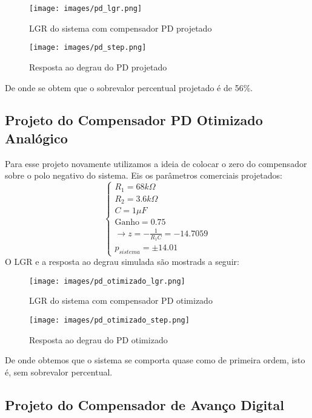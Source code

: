 \begin{figure}[H]
\centering
\texttt{[image: images/pd\_lgr.png]}
\caption{LGR do sistema com compensador PD projetado}
\label{fig:pd-normal-lgr}
\end{figure}

\begin{figure}[H]
\centering
\texttt{[image: images/pd\_step.png]}
\caption{Resposta ao degrau do PD projetado}
\label{fig:pd-normal-step}
\end{figure}

De onde se obtem que o sobrevalor percentual projetado é de 56\%.

\subsection{Projeto do Compensador PD Otimizado Analógico}
Para esse projeto novamente utilizamos a ideia de colocar 
o zero do compensador sobre o polo negativo do sistema. Eis os parâmetros comerciais projetados:
\begin{equation}
    \left\{ \begin{array}{l}
     R_1 = 68k \Omega  \\
     R_2 = 3.6k \Omega  \\
     C = 1 \mu F \\ 
     \mbox{Ganho} = 0.75 \\
     \rightarrow z = -\frac{1}{R_1C} =   -14.7059 \\
     p_{sistema} = \pm 14.01
    \end{array}\right.
\end{equation}
O LGR e a resposta ao degrau simulada são mostrads a seguir:

\begin{figure}[H]
\centering
\texttt{[image: images/pd\_otimizado\_lgr.png]}
\caption{LGR do sistema com compensador PD otimizado}
\label{fig:pd-normal-lgr}
\end{figure}

\begin{figure}[H]
\centering
\texttt{[image: images/pd\_otimizado\_step.png]}
\caption{Resposta ao degrau do PD otimizado}
\label{fig:pd-normal-step}
\end{figure}

De onde obtemos que o sistema se comporta quase como de primeira ordem, isto é, sem sobrevalor percentual.


\subsection{Projeto do Compensador de Avanço Digital}

